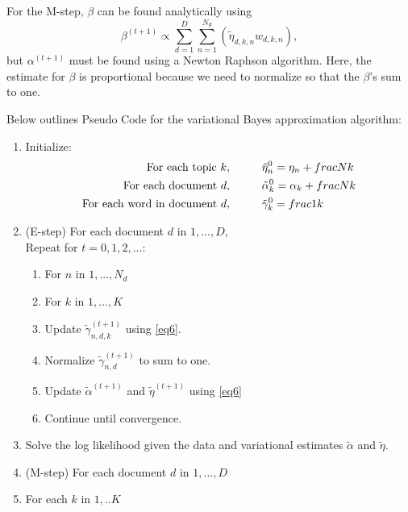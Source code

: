 \documentclass[12pt]{report}
\begin{document}
\begin{flushleft}
For the M-step, $\beta$ can be found analytically using 
\begin{equation} \label{eq7}
\beta^{(t+1)} \propto \sum_{d=1}^{D}\sum_{n=1}^{N_{d}}{(\tilde{\eta}_{d,k,n}w_{d,k,n})},
\end{equation} 
but $\alpha^{(t+1)}$ must be found using a Newton Raphson algorithm. Here, the estimate for $\beta$ is proportional because we need to normalize so that the $\beta$'s sum to one.

Below outlines Pseudo Code for the variational Bayes approximation algorithm:
\begin{enumerate}
	\item Initialize: \begin{align*}
	\text{For each topic } k, \hspace{10mm} &\tilde{\eta}^{0}_{n}=\eta_{n}+frac{N}{k} \\
	\text{For each document } d, \hspace{10mm}&\tilde{\alpha}^{0}_{k}=\alpha_{k}+frac{N}{k} \\
	\text{For each word in document } d, \hspace{10mm}&\tilde{\gamma}^{0}_{k}=frac{1}{k} \\
	\end{align*} 
	\item (E-step) For each document $d$ in $1,...,D$, \\ Repeat for $t=0,1,2,...$:
	\begin{enumerate}
		\item For $n$ in $1,...,N_{d}$
		\item \hspace{5mm} For $k$ in $1,...,K$ 
		\item \hspace{10mm} Update $\tilde{\gamma}^{(t+1)}_{n,d,k}$ using \ref{eq6}.
		\item \hspace{5mm} Normalize $\tilde{\gamma}^{(t+1)}_{n,d}$ to sum to one.
		\item Update $\tilde{\alpha}^{(t+1)}$ and $\tilde{\eta}^{(t+1)}$ using \ref{eq6}
		\item Continue until convergence.
	\end{enumerate}
	\item Solve the log likelihood given the data and variational estimates $\tilde{\alpha}$ and $\tilde{\eta}$.
	\item (M-step) For each document $d$ in $1,...,D$
	\item \hspace{5mm} For each $k$ in $1,..K$

\end{enumerate}
\end{flushleft}
\end{document}
